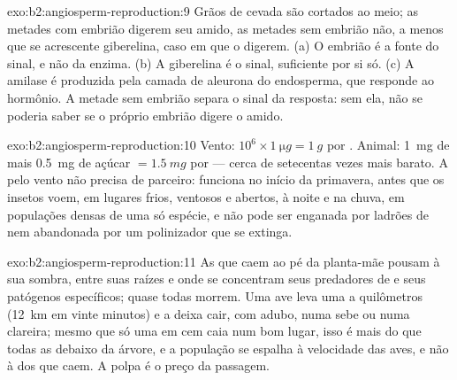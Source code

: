 \begin{solution}{exo:b2:angiosperm-reproduction:9}
Grãos de cevada são cortados ao meio; as metades com embrião digerem
seu amido, as metades sem embrião não, a menos que se acrescente
giberelina, caso em que o digerem. (a) O embrião é a fonte do sinal, e
não da enzima. (b) A giberelina é o sinal, suficiente por si só. (c) A
amilase é produzida pela camada de aleurona do endosperma, que responde
ao hormônio. A metade sem embrião separa o sinal da resposta: sem ela,
não se poderia saber se o próprio embrião digere o amido.
\end{solution}

\begin{solution}{exo:b2:angiosperm-reproduction:10}
Vento: $10^{6}\times\qty{1}{\micro g} = \qty{1}{g}$ por . Animal:
\qty{1}{mg} de  mais \qty{0.5}{mg} de açúcar $= \qty{1.5}{mg}$
por  --- cerca de setecentas vezes mais barato. A  pelo
vento não precisa de parceiro: funciona no início da primavera, antes
que os insetos voem, em lugares frios, ventosos e abertos, à noite e
na chuva, em populações densas de uma só espécie, e não pode ser
enganada por ladrões de  nem abandonada por um polinizador que
se extinga.
\end{solution}

\begin{solution}{exo:b2:angiosperm-reproduction:11}
As  que caem ao pé da planta-mãe pousam à sua sombra, entre
suas raízes e onde se concentram seus predadores de  e seus
patógenos específicos; quase todas morrem. Uma ave leva uma  a
quilômetros (\qty{12}{km} em vinte minutos) e a deixa cair, com adubo,
numa sebe ou numa clareira; mesmo que só uma  em cem caia num
bom lugar, isso é mais do que todas as  debaixo da árvore, e a
população se espalha à velocidade das aves, e não à dos  que
caem. A polpa é o preço da passagem.
\end{solution}

